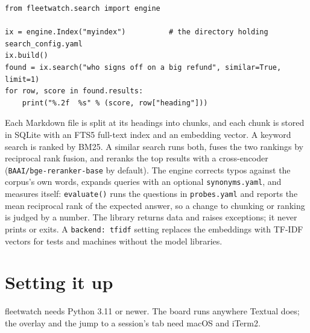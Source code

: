 \documentclass[11pt, letterpaper]{article}
\newenvironment{code}{\par\smallskip\small}{\par\smallskip}
\newcommand{\cmd}[1]{\texttt{#1}}
\begin{document}
\begin{code}
\begin{verbatim}
from fleetwatch.search import engine

ix = engine.Index("myindex")          # the directory holding search_config.yaml
ix.build()
found = ix.search("who signs off on a big refund", similar=True, limit=1)
for row, score in found.results:
    print("%.2f  %s" % (score, row["heading"]))
\end{verbatim}
\end{code}

Each Markdown file is split at its headings into chunks, and each chunk is stored in SQLite
with an FTS5 full-text index and an embedding vector. A keyword search is ranked by BM25. A
similar search runs both, fuses the two rankings by reciprocal rank fusion, and reranks the
top results with a cross-encoder (\cmd{BAAI/bge-reranker-base} by default). The engine
corrects typos against the corpus's own words, expands queries with an optional
\cmd{synonyms.yaml}, and measures itself: \cmd{evaluate()} runs the questions in
\cmd{probes.yaml} and reports the mean reciprocal rank of the expected answer, so a change to
chunking or ranking is judged by a number. The library returns data and raises exceptions; it
never prints or exits. A \cmd{backend: tfidf} setting replaces the embeddings with TF-IDF
vectors for tests and machines without the model libraries.

\section{Setting it up}

fleetwatch needs Python 3.11 or newer. The board runs anywhere Textual does; the overlay and
the jump to a session's tab need macOS and iTerm2.
\end{document}
